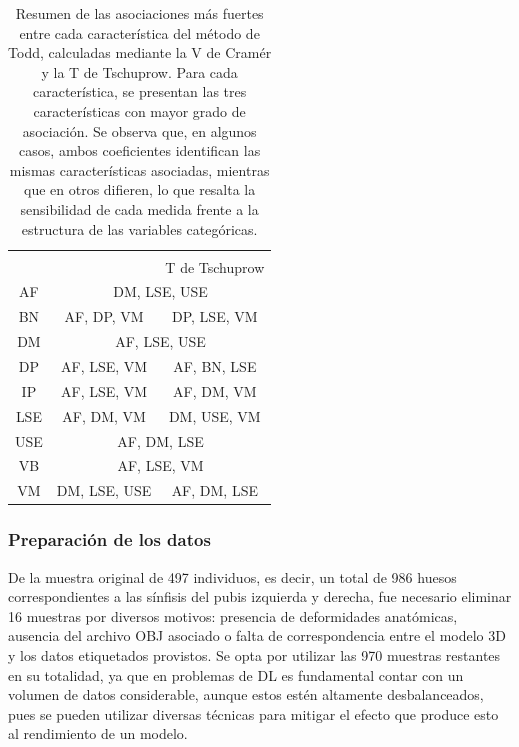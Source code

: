 \begin{table}[t]
    \centering
    \begin{tabular}{|c|cc|}
        \hline
        \rowcolor[HTML]{D33333} 
        \cellcolor[HTML]{D33333}{\color[HTML]{FFFFFF} } & \multicolumn{2}{c|}{\cellcolor[HTML]{D33333}{\color[HTML]{FFFFFF} Características con mayor asociación}} \\ \cline{2-3} 
        \rowcolor[HTML]{D33333} 
        \multirow{-2}{*}{\cellcolor[HTML]{D33333}{\color[HTML]{FFFFFF} Característica}} & \multicolumn{1}{c|}{\cellcolor[HTML]{D33333}{\color[HTML]{FFFFFF} V de Cramér}} & {\color[HTML]{FFFFFF} T de Tschuprow} \\ \hline
        AF & \multicolumn{2}{c|}{DM, LSE, USE} \\ \cline{2-3} 
        BN & \multicolumn{1}{c|}{AF, DP, VM} & DP, LSE, VM \\ \cline{2-3} 
        DM & \multicolumn{2}{c|}{AF, LSE, USE} \\ \cline{2-3} 
        DP & \multicolumn{1}{c|}{AF, LSE, VM} & AF, BN, LSE \\
        IP & \multicolumn{1}{c|}{AF, LSE, VM} & AF, DM, VM \\
        LSE & \multicolumn{1}{c|}{AF, DM, VM} & DM, USE, VM \\ \cline{2-3} 
        USE & \multicolumn{2}{c|}{AF, DM, LSE} \\ \cline{2-3} 
        VB & \multicolumn{2}{c|}{AF, LSE, VM} \\ \cline{2-3} 
        VM & \multicolumn{1}{c|}{DM, LSE, USE} & AF, DM, LSE \\ \hline
    \end{tabular}
    \caption[Cuadro resumen de las asociaciones más fuertes entre características de Todd]{Resumen de las asociaciones más fuertes entre cada característica del método de Todd, calculadas mediante la V de Cramér y la T de Tschuprow. Para cada característica, se presentan las tres características con mayor grado de asociación. Se observa que, en algunos casos, ambos coeficientes identifican las mismas características asociadas, mientras que en otros difieren, lo que resalta la sensibilidad de cada medida frente a la estructura de las variables categóricas.}
    \label{table4:corr}
\end{table}

\subsubsection{Preparación de los datos}
\label{section4:data_preparation}
De la muestra original de 497 individuos, es decir, un total de 986 huesos correspondientes a las sínfisis del pubis izquierda y derecha, fue necesario eliminar 16 muestras por diversos motivos: presencia de deformidades anatómicas, ausencia del archivo OBJ asociado o falta de correspondencia entre el modelo 3D y los datos etiquetados provistos. Se opta por utilizar las 970 muestras restantes en su totalidad, ya que en problemas de DL es fundamental contar con un volumen de datos considerable, aunque estos estén altamente desbalanceados, pues se pueden utilizar diversas técnicas para mitigar el efecto que produce esto al rendimiento de un modelo. 

